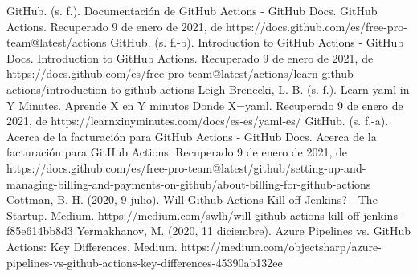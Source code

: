 \documentclass[twoside,twocolumn]{article}
\begin{document}
\begin{thebibliography}{99} 

\bibitem[1]{}
\newblock GitHub. (s. f.). Documentación de GitHub Actions - GitHub Docs. GitHub Actions. Recuperado 9 de enero de 2021, de https://docs.github.com/es/free-pro-team@latest/actions
\bibitem[2]{}
\newblock GitHub. (s. f.-b). Introduction to GitHub Actions - GitHub Docs. Introduction to GitHub Actions. Recuperado 9 de enero de 2021, de https://docs.github.com/es/free-pro-team@latest/actions/learn-github-actions/introduction-to-github-actions
\bibitem[3]{}
\newblock Leigh Brenecki, L. B. (s. f.). Learn yaml in Y Minutes. Aprende X en Y minutos Donde X=yaml. Recuperado 9 de enero de 2021, de https://learnxinyminutes.com/docs/es-es/yaml-es/
\bibitem[4]{}
\newblock GitHub. (s. f.-a). Acerca de la facturación para GitHub Actions - GitHub Docs. Acerca de la facturación para GitHub Actions. Recuperado 9 de enero de 2021, de https://docs.github.com/es/free-pro-team@latest/github/setting-up-and-managing-billing-and-payments-on-github/about-billing-for-github-actions
\bibitem[5]{}
\newblock Cottman, B. H. (2020, 9 julio). Will Github Actions Kill off Jenkins? - The Startup. Medium. https://medium.com/swlh/will-github-actions-kill-off-jenkins-f85e614bb8d3
\bibitem[6]{}
\newblock Yermakhanov, M. (2020, 11 diciembre). Azure Pipelines vs. GitHub Actions: Key Differences. Medium. https://medium.com/objectsharp/azure-pipelines-vs-github-actions-key-differences-45390ab132ee

\end{thebibliography}


\end{document}
